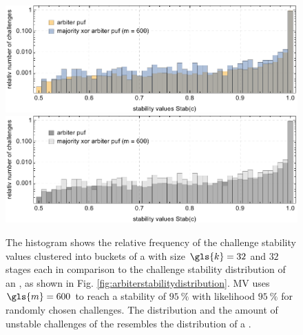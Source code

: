 \begin{figure}[ht]
\ifx{}\undefined
{}
\else
	\if{}
\centering
\includegraphics[width=1.00\textwidth]{images/comparison-arbiter-stability-distribution-majority-xor-stability-distribution.pdf}
	\else
\includegraphics[width=1.00\textwidth]{images/comparison-arbiter-stability-distribution-majority-xor-stability-distribution_mono.pdf}  
    \fi
\fi
\caption[Challenge stability distribution of a Majority \acs{XOR} \apuf]{The histogram shows the relative frequency of the challenge stability values clustered into buckets of a \mxpuf with size $\gls{k} = 32$ and $32$ stages each in comparison to the challenge stability distribution of an \apuf, as shown in Fig. \ref{fig:arbiterstabilitydistribution}. \ac{MV} uses $\gls{m} = 600$ to reach a stability of $95\ \%$ with likelihood $95\ \%$ for randomly chosen challenges. The distribution and the amount of unstable challenges of the \mxpuf resembles the distribution of a \apuf.} 
\label{fig:comparisonarbiterstabilitydistributionmajorityxorstabilitydistribution}
\end{figure}












